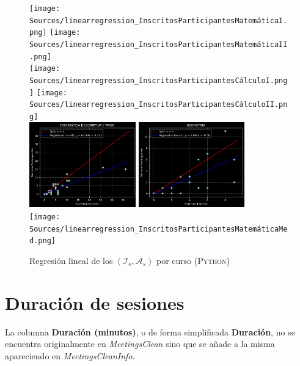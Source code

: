 \documentclass[11pt,a4paper]{book}
\theoremstyle{definition}%
\begin{document}
                    \begin{figure}[H]
                        \centering
                        \texttt{[image: Sources/linearregression\_InscritosParticipantesMatemáticaI.png]}
                        \texttt{[image: Sources/linearregression\_InscritosParticipantesMatemáticaII.png]}
                        \\[\smallskipamount]
                        \texttt{[image: Sources/linearregression\_InscritosParticipantesCálculoI.png]}
                        \texttt{[image: Sources/linearregression\_InscritosParticipantesCálculoII.png]}
                        \\[\smallskipamount]
                        \includegraphics[width=0.41\textwidth]{Sources/linearregression_InscritosParticipantesEstadistica.png}
                        \includegraphics[width=0.41\textwidth]{Sources/linearregression_InscritosParticipantesGeometria.png}
                        \\[\smallskipamount]
                        \texttt{[image: Sources/linearregression\_InscritosParticipantesMatemáticaMed.png]}\hfill
                        \caption{Regresión lineal de los $(\mathcal{I}_s,\mathcal{A}_s)$ por curso (\textsc{Python})}
                        \label{fig:linearregression_InscritosParticipantesCursos}
                    \end{figure}
                \newpage
                
            \section{Duración de sesiones}
                La columna \textbf{Duración (minutos)}, o de forma simplificada \textbf{Duración}, no se encuentra originalmente en \textit{MeetingsClean} sino que se añade a la misma apareciendo en \textit{MeetingsCleanInfo}.
                
\end{document}

